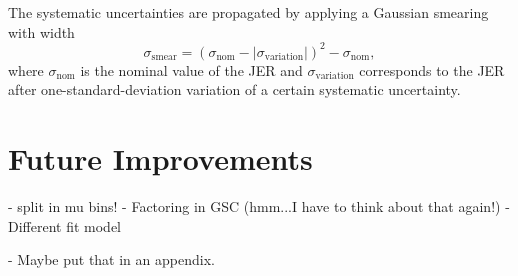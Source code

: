 The systematic uncertainties are propagated by applying a Gaussian smearing with width
\begin{equation}
    \sigma_{\text{smear}} =  \left( \sigma_{\text{nom}} - |\sigma_{\text{variation}}|   \right)^2  - \sigma_{\text{nom}},
\end{equation}
where $\sigma_{\text{nom}}$ is the nominal value of the JER and $\sigma_{\text{variation}}$ corresponds to the JER after one-standard-deviation variation of a certain systematic uncertainty.





\section{Future Improvements}

- split in mu bins!
- Factoring in GSC (hmm...I have to think about that again!)
- Different fit model

- Maybe put that in an appendix.